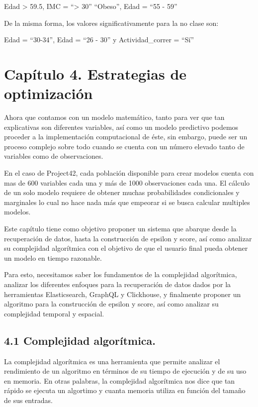 \documentclass[
 12pt,
 letterpaper,
]{article}
\theoremstyle{teoremaBreak}
\theoremstyle{plain}
\theoremstyle{definition}
\begin{document}
Edad \textgreater{} 59.5, IMC = ``\textgreater{} 30'' ``Obeso'', Edad =
``55 - 59''

De la misma forma, los valores significativamente para la no clase son:

Edad = ``30-34'', Edad = ``26 - 30'' y Actividad\_correr = ``Sí''

\section{Capítulo 4. Estrategias de optimización}\label{capuxedtulo-4.-estrategias-de-optimizaciuxf3n}

Ahora que contamos con un modelo matemático, tanto para ver que tan explicativas son diferentes variables, 
así como un modelo predictivo podemos proceder a la implementación computacional de éste, sin embargo,
puede ser un proceso complejo sobre todo cuando se cuenta con un número elevado tanto
de variables como de observaciones.

En el caso de Project42, cada población disponible para crear modelos cuenta con
mas de 600 variables cada una y más de 1000 observaciones cada una. El cálculo
de un solo modelo requiere de obtener muchas probabilidades condicionales
y marginales lo cual no hace nada más que empeorar si se busca calcular multiples modelos.

Este capítulo tiene como objetivo proponer un sistema que abarque desde la recuperación de datos,
hasta la construcción de epsilon y score, así como analizar su complejidad algorítmica con el objetivo de 
que el usuario final pueda obtener un modelo en tiempo razonable.

Para esto, necesitamos saber los fundamentos de la complejidad algorítmica, analizar 
los diferentes enfoques para la recuperación de datos dados por la herramientas Elasticsearch,
GraphQL y Clickhouse, y finalmente proponer un algoritmo para la construcción de epsilon y
score, así como analizar su complejidad temporal y espacial.


\subsection{4.1 Complejidad algorítmica.}\label{complejidad-algoruxedtmica.}

La complejidad algorítmica es una herramienta que permite analizar el rendimiento de un algoritmo
en términos de su tiempo de ejecución y de su uso en memoria. En otras palabras, la complejidad algorítmica
nos dice que tan rápido se ejecuta un algortimo y cuanta memoria utiliza en función del tamaño de sus entradas.
\end{document}
